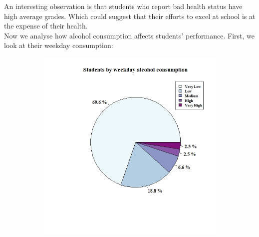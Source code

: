 \documentclass[a4paper, 11pt]{article}
\begin{document}
	An interesting observation is that students who report bad health status have high average grades. Which could suggest that their efforts to excel at school is at the expense of their health.
	\\
	
	Now we analyse how alcohol consumption affects students' performance. First, we look at their weekday consumption: 
	
	\begin{figure}[H]
		\centering
		\begin{subfigure}[b]{0.3\linewidth}
			\hspace*{-1.2in}
			\includegraphics[width=1.6\linewidth]{weekday_alcohol.jpeg}
		\end{subfigure}
		\begin{subfigure}[b]{0.3\linewidth}

\end{subfigure}
\end{figure}
\end{document}
